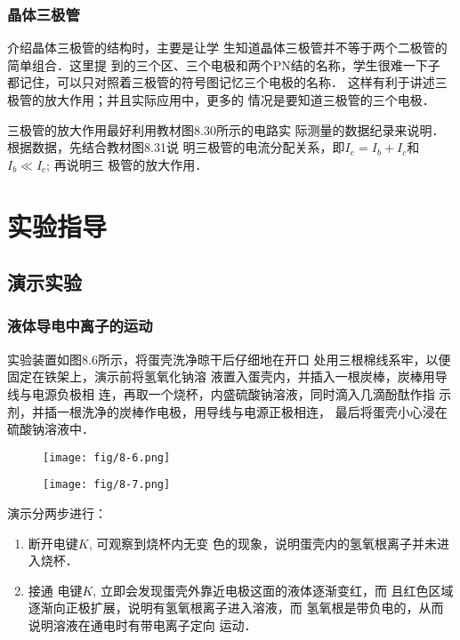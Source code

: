 \subsubsection{晶体三极管}

介绍晶体三极管的结构时，主要是让学
生知道晶体三极管并不等于两个二极管的简单组合．这里提
到的三个区、三个电极和两个PN结的名称，学生很难一下子
都记住，可以只对照着三极管的符号图记忆三个电极的名称．
这样有利于讲述三极管的放大作用；并且实际应用中，更多的
情况是要知道三极管的三个电极．

三极管的放大作用最好利用教材图8.30所示的电路实
际测量的数据纪录来说明．根据数据，先结合教材图8.31说
明三极管的电流分配关系，即$I_e=I_b+I_c$和$I_b\ll I_c$; 再说明三
极管的放大作用．

\section{实验指导}
\subsection{演示实验}
\subsubsection{液体导电中离子的运动}
实验装置如图8.6所示，将蛋壳洗净晾干后仔细地在开口
处用三根棉线系牢，以便固定在铁架上，演示前将氢氧化钠溶
液置入蛋壳内，并插入一根炭棒，炭棒用导线与电源负极相
连，再取一个烧杯，内盛硫酸钠溶液，同时滴入几滴酚酞作指
示剂，并插一根洗净的炭棒作电极，用导线与电源正极相连，
最后将蛋壳小心浸在硫酸钠溶液中．
\begin{figure}[htp]\centering
    \begin{minipage}[t]{0.48\textwidth}
    \centering
    \texttt{[image: fig/8-6.png]}
    \caption{}
    \end{minipage}
    \begin{minipage}[t]{0.48\textwidth}
    \centering
    \texttt{[image: fig/8-7.png]}
    \caption{}
    \end{minipage}
    \end{figure}

演示分两步进行：
\begin{enumerate}
    \item 断开电键$K$, 可观察到烧杯内无变
色的现象，说明蛋壳内的氢氧根离子并未进入烧杯．
\item 接通
电键$K$, 立即会发现蛋壳外靠近电极这面的液体逐渐变红，而
且红色区域逐渐向正极扩展，说明有氢氧根离子进入溶液，而
氢氧根是带负电的，从而说明溶液在通电时有带电离子定向
运动．
\end{enumerate}

